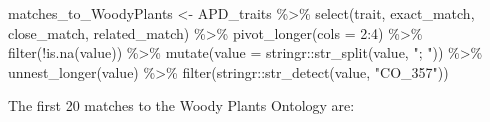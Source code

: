 \documentclass[
  letterpaper,
  DIV=11,
  numbers=noendperiod]{scrartcl}
\newenvironment{Shaded}{\begin{snugshade}}{\end{snugshade}}
\newcommand{\AttributeTok}[1]{\textcolor[rgb]{0.40,0.45,0.13}{#1}}
\newcommand{\DecValTok}[1]{\textcolor[rgb]{0.68,0.00,0.00}{#1}}
\newcommand{\FunctionTok}[1]{\textcolor[rgb]{0.28,0.35,0.67}{#1}}
\newcommand{\NormalTok}[1]{\textcolor[rgb]{0.00,0.23,0.31}{#1}}
\newcommand{\OtherTok}[1]{\textcolor[rgb]{0.00,0.23,0.31}{#1}}
\newcommand{\SpecialCharTok}[1]{\textcolor[rgb]{0.37,0.37,0.37}{#1}}
\newcommand{\StringTok}[1]{\textcolor[rgb]{0.13,0.47,0.30}{#1}}
\begin{document}
\begin{Shaded}
\begin{Highlighting}[]
\NormalTok{matches\_to\_WoodyPlants }\OtherTok{\textless{}{-}} 
\NormalTok{  APD\_traits }\SpecialCharTok{\%\textgreater{}\%}
  \FunctionTok{select}\NormalTok{(trait, exact\_match, close\_match, related\_match) }\SpecialCharTok{\%\textgreater{}\%}
  \FunctionTok{pivot\_longer}\NormalTok{(}\AttributeTok{cols =} \DecValTok{2}\SpecialCharTok{:}\DecValTok{4}\NormalTok{) }\SpecialCharTok{\%\textgreater{}\%}
  \FunctionTok{filter}\NormalTok{(}\SpecialCharTok{!}\FunctionTok{is.na}\NormalTok{(value)) }\SpecialCharTok{\%\textgreater{}\%}
  \FunctionTok{mutate}\NormalTok{(}\AttributeTok{value =}\NormalTok{ stringr}\SpecialCharTok{::}\FunctionTok{str\_split}\NormalTok{(value, }\StringTok{"; "}\NormalTok{)) }\SpecialCharTok{\%\textgreater{}\%}
  \FunctionTok{unnest\_longer}\NormalTok{(value) }\SpecialCharTok{\%\textgreater{}\%}
  \FunctionTok{filter}\NormalTok{(stringr}\SpecialCharTok{::}\FunctionTok{str\_detect}\NormalTok{(value, }\StringTok{"CO\_357"}\NormalTok{))}
\end{Highlighting}
\end{Shaded}

The first 20 matches to the Woody Plants Ontology are:
\end{document}

